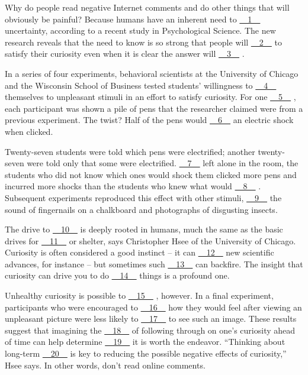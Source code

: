 Why do people read negative Internet comments and do other things that will obviously be painful? Because humans have an inherent need to \uline{~~1~~} uncertainty, according to a recent study in Psychological Science. The new research reveals that the need to know is so strong that people will \uline{~~2~~} to satisfy their curiosity even when it is clear the answer will \uline{~~3~~} .


In a series of four experiments, behavioral scientists at the University of Chicago and the Wisconsin School of Business tested students' willingness to \uline{~~4~~} themselves to unpleasant stimuli in an effort to satisfy curiosity. For one \uline{~~5~~} , each participant was shown a pile of pens that the researcher claimed were from a previous experiment. The twist? Half of the pens would \uline{~~6~~} an electric shock when clicked.


Twenty-seven students were told which pens were electrified; another twenty-seven were told only that some were electrified. \uline{~~7~~} left alone in the room, the students who did not know which ones would shock them clicked more pens and incurred more shocks than the students who knew what would \uline{~~8~~} . Subsequent experiments reproduced this effect with other stimuli, \uline{~~9~~} the sound of fingernails on a chalkboard and photographs of disgusting insects.


The drive to \uline{~~10~~} is deeply rooted in humans, much the same as the basic drives for \uline{~~11~~} or shelter, says Christopher Hsee of the University of Chicago. Curiosity is often considered a good instinct – it can \uline{~~12~~} new scientific advances, for instance – but sometimes such \uline{~~13~~} can backfire. The insight that curiosity can drive you to do \uline{~~14~~} things is a profound one.


Unhealthy curiosity is possible to \uline{~~15~~} , however. In a final experiment, participants who were encouraged to \uline{~~16~~} how they would feel after viewing an unpleasant picture were less likely to \uline{~~17~~} to see such an image. These results suggest that imagining the \uline{~~18~~} of following through on one's curiosity ahead of time can help determine \uline{~~19~~} it is worth the endeavor. ``Thinking about long-term \uline{~~20~~} is key to reducing the possible negative effects of curiosity,'' Hsee says. In other words, don't read online comments.